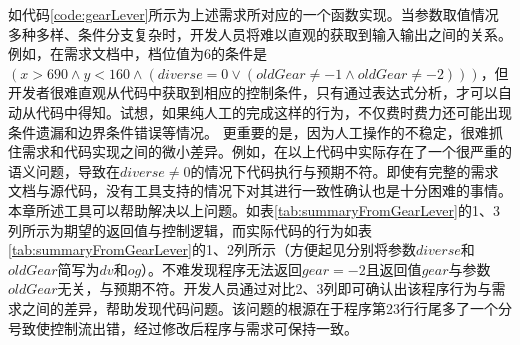如代码\ref{code:gearLever}所示为上述需求所对应的一个函数实现。当参数取值情况多种多样、条件分支复杂时，开发人员将难以直观的获取到输入输出之间的关系。例如，在需求文档中，档位值为6的条件是$  (x > 690 ∧ y < 160 ∧ (diverse = 0 ∨ (oldGear ≠ -1 ∧ oldGear ≠ -2))) $，但开发者很难直观从代码中获取到相应的控制条件，只有通过表达式分析，才可以自动从代码中得知。试想，如果纯人工的完成这样的行为，不仅费时费力还可能出现条件遗漏和边界条件错误等情况。
更重要的是，因为人工操作的不稳定，很难抓住需求和代码实现之间的微小差异。例如，在以上代码中实际存在了一个很严重的语义问题，导致在$ diverse ≠ 0 $的情况下代码执行与预期不符。即使有完整的需求文档与源代码，没有工具支持的情况下对其进行一致性确认也是十分困难的事情。
本章所述工具可以帮助解决以上问题。如表\ref{tab:summaryFromGearLever}的1、3列所示为期望的返回值与控制逻辑，而实际代码的行为如表\ref{tab:summaryFromGearLever}的1、2列所示（方便起见分别将参数$ diverse $和$ oldGear $简写为$ dv $和$ og $）。不难发现程序无法返回$ gear = -2 $且返回值$ gear $与参数$ oldGear $无关，与预期不符。开发人员通过对比2、3列即可确认出该程序行为与需求之间的差异，帮助发现代码问题。该问题的根源在于程序第23行行尾多了一个分号致使控制流出错，经过修改后程序与需求可保持一致。

